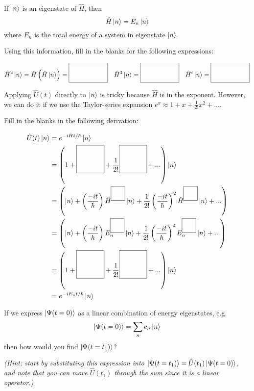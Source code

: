 	\begin{questions}
	
		\vspace{0.2in}
		\question If $\ket{n}$ is an eigenstate of $\hat H$, then
			\begin{equation*}
				\hat H\ket{n} = E_n\ket{n}
			\end{equation*}	
			where $E_n$ is the total energy of a system in eigenstate $\ket{n}$.
			
			Using this information, fill in the blanks for the following expressions:
			
			\begin{align*}
				\hat H^2\ket{n} = \hat H \left(\hat H \ket{n}\right) =  \raisebox{-2ex}{\framebox(60,30){}} & & \hat H^3 \ket{n} =   \raisebox{-2ex}{\framebox(60,30){}} & & \hat H^i \ket{n} =  \raisebox{-2ex}{\framebox(60,30){}}
			\end{align*}
			
			\vspace{0.1in}
		\question Applying $\hat U(t)$ directly to $\ket{n}$ is tricky because $\hat H$ is in the exponent. However, we can do it if we use the Taylor-series expansion $e^x \approx 1 + x + \frac{1}{2!} x^2 + ...$.
		
			Fill in the blanks in the following derivation:
			
			\begin{align*}
				\hat U(t)\ket{n} &= e^{-i\hat H t/\hbar}\ket{n}\\
				&= \left(1 + \raisebox{-2ex}{\framebox(40,40){}} + \frac{1}{2!}\raisebox{-2ex}{\framebox(40,40){}}  + ...\right)\ket{n}\\
				&= \left( \ket{n} + \left(\frac{-it}{\hbar}\right)\hat H^{\framebox(20,20){}}\ket{n} + \frac{1}{2!} \left(\frac{-it}{\hbar}\right)^2\hat H^{\framebox(20,20){}}\ket{n} + ...\right)\\
				&= \left( \ket{n} + \left(\frac{-it}{\hbar}\right) E_n^{\framebox(20,20){}}\ket{n} + \frac{1}{2!} \left(\frac{-it}{\hbar}\right)^2 E_n^{\framebox(20,20){}}\ket{n} + ...\right)\\
				&= \left(1 + \raisebox{-2ex}{\framebox(40,40){}} + \frac{1}{2!}\raisebox{-2ex}{\framebox(40,40){}}  + ...\right)\ket{n}\\
				&= e^{-i E_n t/\hbar}\ket{n}
			\end{align*}
			
			\vspace{0.2in}
			\contdnewpg
		
		\newpage
		\question If we express $\ket{\Psi(t=0)}$ as a linear combination of energy eigenstates, e.g.
			\begin{equation*}
				\ket{\Psi(t=0)} = \sum_n c_n \ket{n}
			\end{equation*}
			then how would you find $\ket{\Psi(t=t_1)}$?
			
			\emph{(Hint: start by substituting this expression into $\ket{\Psi(t=t_1)} = \hat U(t_1)\ket{\Psi(t=0)}$, and note that you can move $\hat U(t_1)$ through the sum since it is a linear operator.)}
			
			\begin{solution}[7in]
			\end{solution}
	
	\end{questions}
	
	\stophere